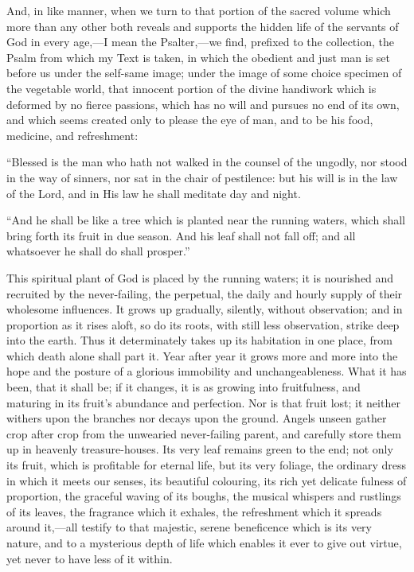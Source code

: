 And, in like manner, when we turn to that portion of
the sacred volume which more than any other both reveals
and supports the hidden life of the servants of God in
every age,—I mean the Psalter,—we find,
prefixed to the collection, the Psalm from which my Text
is taken, in which the obedient and just man is set
before us under the self-same image; under the image of
some choice specimen of the vegetable world, that
innocent portion of the divine handiwork which is
deformed by no fierce passions, which has no will and
pursues no end of its own, and which seems created only
to please the eye of man, and to be his food, medicine,
and refreshment:

``Blessed is the man who hath not walked in the
counsel of the ungodly, nor stood in the way of sinners,
nor sat in the chair of pestilence: but his will is in
the law of the Lord, and in His law he shall meditate day
and night.

``And he shall be like a tree which is planted
near the running waters, which shall bring forth its
fruit in due season. And his leaf shall not fall off; and
all whatsoever he shall do shall prosper.''

This spiritual plant of God is placed by the running
waters; it is nourished and recruited by the
never-failing, the perpetual, the daily and hourly supply
of their wholesome influences. It grows up gradually,
silently, without observation; and in proportion as it
rises aloft, so do its roots, with still less
observation, strike deep into the earth. Thus it
determinately takes up its habitation in one place, from
which death alone shall part it. Year after year it grows
more and more into the hope and the posture of a glorious
immobility and unchangeableness. What it has been, that
it shall be; if it changes, it is as growing into
fruitfulness, and maturing in its fruit's abundance and
perfection. Nor is that fruit lost; it neither withers
upon the branches nor decays upon the ground. Angels
unseen gather crop after crop from the unwearied
never-failing parent, and carefully store them up in
heavenly treasure-houses. Its very leaf remains green to
the end; not only its fruit, which is profitable for
eternal life, but its very foliage, the ordinary dress in
which it meets our senses, its beautiful colouring, its
rich yet delicate fulness of proportion, the graceful
waving of its boughs, the musical whispers and rustlings
of its leaves, the fragrance which it exhales, the
refreshment which it spreads around it,—all testify
to that majestic, serene beneficence which is its very
nature, and to a mysterious depth of life which enables
it ever to give out virtue, yet never to have less of it
within.

